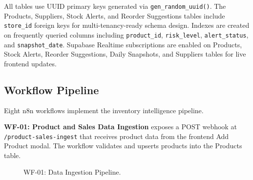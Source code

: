 \documentclass[journal]{IEEEtran}
\begin{document}
All tables use UUID primary keys generated via \texttt{gen\_random\_uuid()}. The Products, Suppliers, Stock Alerts, and Reorder Suggestions tables include \texttt{store\_id} foreign keys for multi-tenancy-ready schema design. Indexes are created on frequently queried columns including \texttt{product\_id}, \texttt{risk\_level}, \texttt{alert\_status}, and \texttt{snapshot\_date}. Supabase Realtime subscriptions are enabled on Products, Stock Alerts, Reorder Suggestions, Daily Snapshots, and Suppliers tables for live frontend updates.

\subsection{Workflow Pipeline}

Eight n8n workflows implement the inventory intelligence pipeline.

\textbf{WF-01: Product and Sales Data Ingestion} exposes a POST webhook at \texttt{/product-sales-ingest} that receives product data from the frontend Add Product modal. The workflow validates and upserts products into the Products table.

\begin{figure}[H]
\centering
{}
\caption{WF-01: Data Ingestion Pipeline.}
\label{fig:wf01}
\end{figure}
\end{document}
